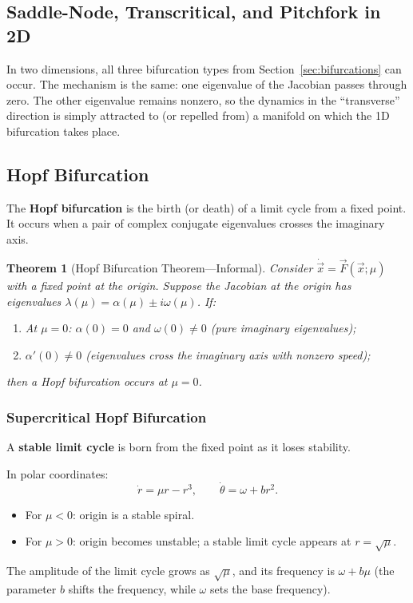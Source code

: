 \documentclass[11pt,letterpaper]{article}
\theoremstyle{definition}
\theoremstyle{plain}
\newtheorem{theorem}{Theorem}[section]
\theoremstyle{remark}
\begin{document}
\subsection{Saddle-Node, Transcritical, and Pitchfork in 2D}

In two dimensions, all three bifurcation types from Section~\ref{sec:bifurcations}
can occur.  The mechanism is the same: one eigenvalue of the Jacobian passes
through zero.  The other eigenvalue remains nonzero, so the dynamics in the
``transverse'' direction is simply attracted to (or repelled from) a
manifold on which the 1D bifurcation takes place.

\subsection{Hopf Bifurcation}\label{sec:hopf}

The \textbf{Hopf bifurcation} is the birth (or death) of a limit cycle from
a fixed point.  It occurs when a pair of complex conjugate eigenvalues
crosses the imaginary axis.

\begin{theorem}[Hopf Bifurcation Theorem---Informal]
Consider $\dot{\vec{x}} = \vec{F}(\vec{x};\mu)$ with a fixed point at
the origin.  Suppose the Jacobian at the origin has eigenvalues
$\lambda(\mu) = \alpha(\mu) \pm i\omega(\mu)$.  If:
\begin{enumerate}[leftmargin=2em]
\item At $\mu=0$: $\alpha(0) = 0$ and $\omega(0) \neq 0$ (pure imaginary
      eigenvalues);
\item $\alpha'(0) \neq 0$ (eigenvalues cross the imaginary axis with
      nonzero speed);
\end{enumerate}
then a Hopf bifurcation occurs at $\mu=0$.
\end{theorem}

\subsubsection{Supercritical Hopf Bifurcation}

A \textbf{stable limit cycle} is born from the fixed point as it loses
stability.

\begin{keyresult}
In polar coordinates:
\begin{equation}\label{eq:hopf-super}
  \dot{r} = \mu r - r^3, \qquad \dot{\theta} = \omega + b r^2.
\end{equation}
\begin{itemize}[leftmargin=2em]
\item For $\mu < 0$: origin is a stable spiral.
\item For $\mu > 0$: origin becomes unstable; a stable limit cycle appears
      at $r = \sqrt{\mu}$.
\end{itemize}
The amplitude of the limit cycle grows as $\sqrt{\mu}$, and its frequency
is $\omega + b\mu$ (the parameter $b$ shifts the frequency, while
$\omega$ sets the base frequency).
\end{keyresult}
\end{document}
